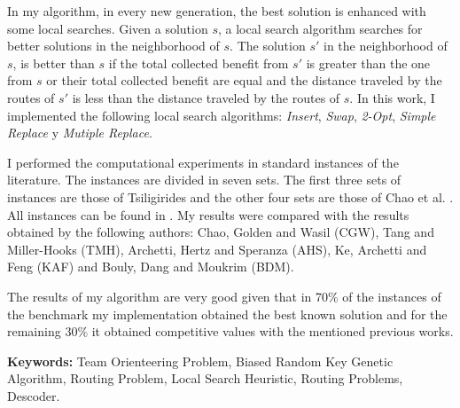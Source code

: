 \bigskip

In my algorithm, in every new generation, the best solution is enhanced with some local searches. Given a solution $s$, a local search algorithm searches for better solutions in the neighborhood of $s$. The solution $s'$ in the neighborhood of $s$, is better than $s$ if the total collected benefit from $s'$ is greater than the one from $s$ or their total collected benefit are equal and the distance traveled by the routes of $s'$ is less than the distance traveled by the routes of $s$. In this work, I implemented the following local search algorithms: \textit{Insert}, \textit{Swap}, \textit{2-Opt}, \textit{Simple Replace} y \textit{Mutiple Replace}.

\bigskip

I performed the computational experiments in standard instances of the literature. The instances are divided in seven sets. The first three sets of instances are those of Tsiligirides \cite{Tsiligirides} and the other four sets are those of Chao et al. \cite{ChaoGoldenWasil}. All instances can be found in \cite{IntancesChaoTsiligirides}. My results were compared with the results obtained by the following authors: Chao, Golden and Wasil \cite{ChaoGoldenWasil} (CGW), Tang and Miller-Hooks \cite{TangMillerHooks} (TMH), Archetti, Hertz and Speranza \cite{ArchettiHertzSperanza} (AHS), Ke, Archetti and Feng \cite{KeArchettiFeng} (KAF) and Bouly, Dang and Moukrim \cite{BoulyDangMoukrim} (BDM). 

\bigskip

The results of my algorithm are very good given that in 70\% of the instances of the benchmark my implementation obtained the best known solution and for the remaining 30\% it obtained competitive values with the mentioned previous works.

\bigskip

\noindent\textbf{Keywords:} Team Orienteering Problem, Biased Random Key Genetic Algorithm, Routing Problem, Local Search Heuristic, Routing Problems, Descoder.